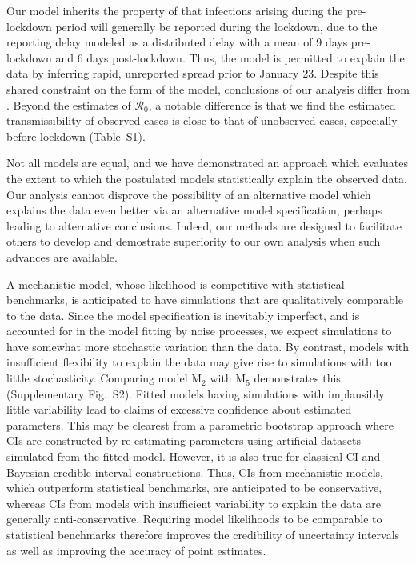 \documentclass[12pt]{article}\usepackage[]{graphicx}\usepackage[]{xcolor}
\newcommand\LiParams{M$_2$}
\newcommand\RevisedModelUnconstrained{M$_5$}
\newcommand\Rzero{\mathcal{R}_0}
\newcommand\suppFigSim{S2}
\begin{document}
Our model inherits the property of \citep{li20} that infections arising during the pre-lockdown period will generally be reported during the lockdown, due to the reporting delay modeled as a distributed delay with a mean of 9 days pre-lockdown and 6 days post-lockdown.
Thus, the model is permitted to explain the data by inferring rapid, unreported spread prior to January 23.
Despite this shared constraint on the form of the model, conclusions of our analysis differ from \cite{li20}.
Beyond the estimates of $\Rzero$, a notable difference is that we find the estimated transmissibility of observed cases is close to that of unobserved cases, especially before lockdown (Table~S1).

Not all models are equal, and we have demonstrated an approach which evaluates the extent to which the postulated models statistically explain the observed data. 
Our analysis cannot disprove the possibility of an alternative model which explains the data even better via an alternative model specification, perhaps leading to alternative conclusions.
Indeed, our methods are designed to facilitate others to develop and demostrate superiority to our own analysis when such advances are available.

A mechanistic model, whose likelihood is competitive with statistical benchmarks, is anticipated to have simulations that are qualitatively comparable to the data.
Since the model specification is inevitably imperfect, and is accounted for in the model fitting by noise processes, we expect simulations to have somewhat more stochastic variation than the data.
By contrast, models with insufficient flexibility to explain the data may give rise to simulations with too little stochasticity.
Comparing model {\LiParams} with {\RevisedModelUnconstrained} demonstrates this (Supplementary Fig.~\suppFigSim).
Fitted models having simulations with implausibly little variability lead to claims of excessive confidence about estimated parameters.
This may be clearest from a parametric bootstrap approach where CIs are constructed by re-estimating parameters using artificial datasets simulated from the fitted model.
However, it is also true for classical CI and Bayesian credible interval constructions.
Thus, CIs from mechanistic models, which outperform statistical benchmarks, are anticipated to be conservative, whereas CIs from models with insufficient variability to explain the data are generally anti-conservative.
Requiring model likelihoods to be comparable to statistical benchmarks therefore improves the credibility of uncertainty intervals as well as improving the accuracy of point estimates.
\end{document}
